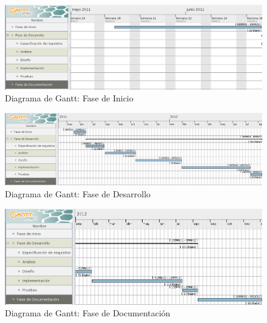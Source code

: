 \begin{figure}[H]
  \label{finicio}
  \begin{center}
    \includegraphics[scale=0.4]{../img/fase-inicio.png} 
  \end{center}
  \caption{Diagrama de Gantt: Fase de Inicio}
\end{figure}

\begin{figure}[H]
  \label{fdes}
  \begin{center}
    \includegraphics[scale=0.4]{../img/fase-desarrollo.png} 
  \end{center}
  \caption{Diagrama de Gantt: Fase de Desarrollo}
\end{figure}

\begin{figure}[H]
  \label{fdoc}
  \begin{center}
    \includegraphics[scale=0.5]{../img/fase-documentacion.png} 
  \end{center}
  \caption{Diagrama de Gantt: Fase de Documentación}
\end{figure}